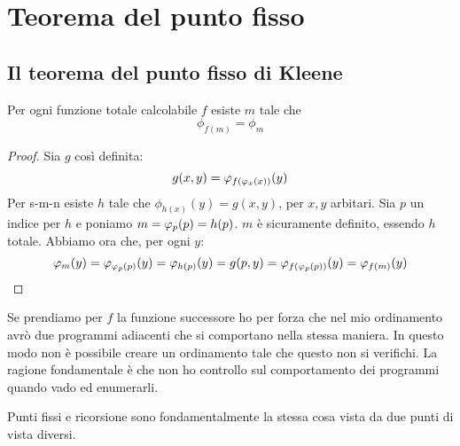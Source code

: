 %
%
%
%
\chapter{Teorema del punto fisso}

\section{Il teorema del punto fisso di Kleene}

\begin{thm}
    Per ogni funzione totale calcolabile $f$ esiste $m$ tale che 
    \begin{equation*}
        \phi_{f(m)} = \phi_{m}
    \end{equation*}
\end{thm}
\begin{proof}
    Sia $g$ così definita:
    \begin{equation*}
        g(x,y) = \varphi_{f(\varphi_{x}(x))}(y)
    \end{equation*}
    Per s-m-n esiste $h$ tale che $\phi_{h(x)}(y) = g(x,y)$, per $x,y$ arbitari. Sia $p$ un indice
    per $h$ e poniamo $m = \varphi_{p}(p) = h(p)$. $m$ è sicuramente definito, essendo $h$ totale.
    Abbiamo ora che, per ogni $y$:
    \begin{equation*}
        \varphi_{m}(y) = \varphi_{\varphi_{p}(p)}(y) = \varphi_{h(p)}(y) = g(p,y) = \varphi_{f(\varphi_{p}(p))}(y) =
        \varphi_{f(m)}(y)
    \end{equation*}
\end{proof}

Se prendiamo per $f$ la funzione successore ho per forza che nel mio ordinamento avrò due programmi
adiacenti che si comportano nella stessa maniera. In questo modo non è possibile creare un
ordinamento tale che questo non si verifichi. La ragione fondamentale è che non ho controllo sul
comportamento dei programmi quando vado ed enumerarli.

Punti fissi e ricorsione sono fondamentalmente la stessa cosa vista da due punti di vista diversi.

